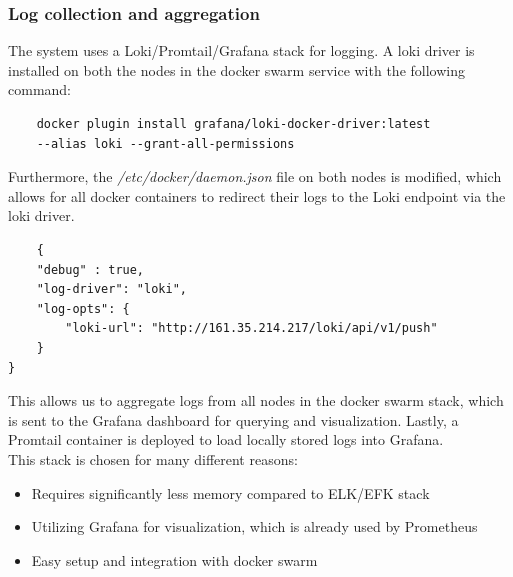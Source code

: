 




\subsubsection{Log collection and aggregation}
The system uses a Loki/Promtail/Grafana stack for logging. A loki driver is installed on both the nodes in the docker swarm service with the following command:

\begin{verbatim}
    docker plugin install grafana/loki-docker-driver:latest
    --alias loki --grant-all-permissions
\end{verbatim}

Furthermore, the \textit{/etc/docker/daemon.json} file on both nodes is modified, which allows for all docker containers to redirect their logs to the Loki endpoint via the loki driver.

\begin{verbatim}
    {
    "debug" : true,
    "log-driver": "loki",
    "log-opts": {
        "loki-url": "http://161.35.214.217/loki/api/v1/push"
    }
}
\end{verbatim}

This allows us to aggregate logs from all nodes in the docker swarm stack, which is sent to the Grafana dashboard for querying and visualization. Lastly, a Promtail container is deployed to load locally stored logs into Grafana.\\

\noindent
This stack is chosen for many different reasons:
\begin{itemize}
    \item Requires significantly less memory compared to ELK/EFK stack
    \item Utilizing Grafana for visualization, which is already used by Prometheus
    \item Easy setup and integration with docker swarm
\end{itemize}

